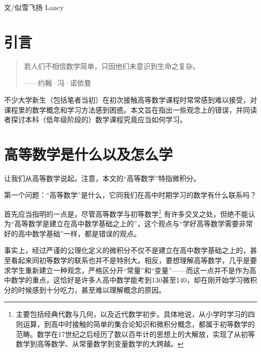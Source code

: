 \begin{flushright}
文/似雪飞扬 Lancy
\end{flushright}

\section{引言}
  \begin{quote}
    若人们不相信数学简单，只因他们未意识到生命之复杂。
    \begin{flushright}
      ——约翰·冯·诺依曼
    \end{flushright}
  \end{quote}

  \hspace*{2em}不少大学新生（包括笔者当初）在初次接触高等数学课程时常常感到难以接受，对课程里的数学概念和学习方法感到困惑。本文旨在指出一些观念上的错误，并同读者探讨本科（低年级阶段的）数学课程究竟应当如何学习。

\section{高等数学是什么以及怎么学}

  \hspace*{2em}让我们从高等数学说起。注意，本文的“高等数学”特指微积分。

  \begin{marker}
  {\heiti 第一个问题：“高等数学”是什么，它同我们在高中时期学习的数学有什么联系吗？}
  \end{marker}

  \hspace*{2em}首先应当指明的一点是，尽管高等数学与初等数学\footnote{主要包括经典代数与几何，以及近代数学初步。具体地说，从小学时学习的四则运算，到高中时接触的简单的集合论知识和微积分概念，都属于初等数学的范畴。数学在17世纪之后经历了数以百年计的思想上的大解放，实现了从初等数学到高等数学、从常量数学到变量数学的大跨越。}
  有许多交叉之处，但绝不能认为“高等数学是建立在高中数学基础之上的”，这个观点与“学好高等数学需要非常好的高中数学基础”一样，都是错误的观点。

  \hspace*{2em}事实上，经过严谨的公理化定义的微积分不仅不是建立在高中数学基础之上的，甚至看起来同初等数学的联系也并不是特别大。相反，要想理解高等数学，几乎是要求学生重新建立一种观念，严格区分开“常量”和“变量”——而这一点并不是作为高中数学的重点，这恰好是许多人高中数学能考到130甚至140，却在刚开始学习微积分的时候感到十分吃力，甚至难以理解概念的原因。

